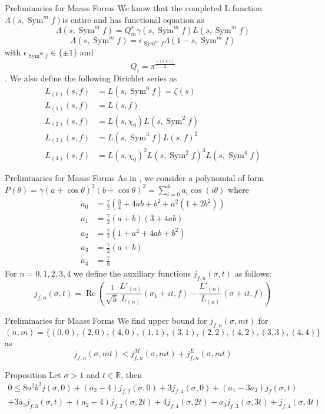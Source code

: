 \documentclass{beamer}
\def\Sym{\operatorname{Sym}}
\def\Re{\operatorname{Re}}
\begin{document}
\begin{frame}{Preliminaries for Maass Forms}
We know that the completed L function $\Lambda(s,\Sym^mf)$is entire and has functional equation as \[
\Lambda(s,\Sym^mf) = Q_m^s\gamma(s,\Sym^mf)L(s,\Sym^mf) 
\] 
\[
\Lambda(s,\Sym^mf)= \epsilon_{\Sym^mf}\Lambda(1-s,\Sym^mf)  
\]
with $\epsilon_{\Sym^mf} \in \{\pm 1\} $ and 
\[
Q_i = \pi^{\frac{-(i+1)}{2}}
\].
   We also define the following Dirichlet series as 
\begin{align*}
      L_{(0)}(s,f)&= L(s,\Sym^0f)=\zeta(s)\\
L_{(1)}(s,f)&= L(s,f)\\
L_{(2)}(s,f)&= L(s,\chi_0)L(s,\Sym^2f)\\
L_{(3)}(s,f)&= L(s,\Sym^3f)L(s,f)^2\\
L_{(4)}(s,f)&= L(s,\chi_0)^2L(s,\Sym^2f)^3L(s,\Sym^4f) 
\end{align*}
\end{frame}
\begin{frame}{Preliminaries for Maass Forms}
As in \cite{IPENT}, we consider a polynomial of form $P(\theta) = \gamma(a+\cos \theta)^2(b+\cos\theta)^2 = \displaystyle\sum_{i=0}^4 a_i\cos(i\theta)$ where 
\begin{align*}
    a_0 &= \frac{\gamma}{2}\left( \frac{3}{4} + 4ab+b^2+a^2(1+2b^2)\right)\\
    a_1 &= \frac{\gamma}{2}(a+b)(3+4ab)\\
    a_2 &=\frac{\gamma}{2}(1+a^2+4ab+b^2)\\
    a_3 &= \frac{\gamma}{2}(a+b)\\
    a_4 &= \frac{\gamma}{8}
\end{align*}
For $ n = 0 , 1 , 2 , 3 , 4 $ we define the auxiliary functions $j_{f,n}(\sigma,t)$ as follows: 
\[
j_{f,n}(\sigma,t) = \Re\left( \frac{1}{\sqrt{5}}\frac{L'_{(n)}}{L_{(n)}} (\sigma_1+it,f)-\frac{L'_{(n)}}{L_{(n)}} (\sigma+it,f) \right)
\]
\end{frame}
\begin{frame}{Preliminaries for Maass Forms}
    We find upper bound for $j_{f,n}(\sigma,mt)$ for $ (n,m) = \{ (0,0),(2,0),(4,0),(1,1),(3,1),(2,2),(4,2),(3,3),(4,4)\} $ as \[
    j_{f,n}(\sigma,mt)< j_{f,n}^M(\sigma,mt) +j_{f,n}^E(\sigma,mt)
    \]
\begin{block}{Proposition}
     Let $\sigma>1$ and $t \in \mathbb{R}$, then 
    \begin{multline*}
        0\leq 8a^2b^2j(\sigma,0) + (a_2-4)j_{f,2}(\sigma,0)+3j_{f,4}(\sigma,0) +(a_1-3a_3)j_f(\sigma,t) \\+ 3a_3j_{f,3}(\sigma,t) + (a_2-4)j_{f,2}(\sigma,2t) + 4j_{f,4}(\sigma,2t) + a_3j_{f,3}(\sigma,3t) + j_{f,4}(\sigma,4t) 
    \end{multline*} 
\end{block}

\end{frame}
\end{document}
